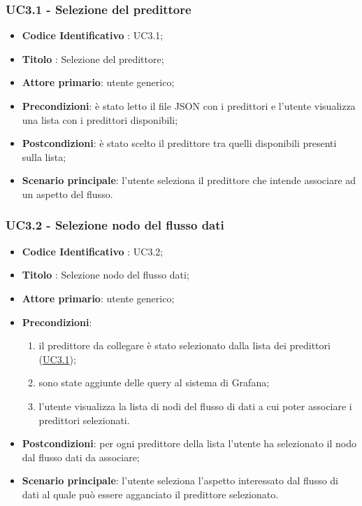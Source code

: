 		\label{par:UC3.1}
		\subsubsection{UC3.1 - Selezione del predittore}
		\begin{itemize}
			\item\textbf{Codice Identificativo} : UC3.1;
			\item\textbf{Titolo} : Selezione del predittore;
			\item\textbf{Attore primario}: utente generico;
			\item\textbf{Precondizioni}: è stato letto il file JSON con i predittori e l'utente visualizza una lista con i predittori disponibili;
			\item\textbf{Postcondizioni}: è stato scelto il predittore tra quelli disponibili presenti sulla lista;
			\item\textbf{Scenario principale}: l'utente seleziona il predittore che intende associare ad un aspetto del flusso.
		\end{itemize}
		
	
	\label{par:UC3.2}
	\subsubsection{UC3.2 - Selezione nodo del flusso dati}
		\begin{itemize}
			\item\textbf{Codice Identificativo} : UC3.2;
			\item\textbf{Titolo} : Selezione nodo del flusso dati;
			\item\textbf{Attore primario}: utente generico;
			\item\textbf{Precondizioni}:
				\begin{enumerate}
					\item il predittore da collegare è stato selezionato dalla lista dei predittori (\hyperref[par:UC3.1]{UC3.1});
					\item sono state aggiunte delle query al sistema di Grafana;
					\item l'utente visualizza la lista di nodi del flusso di dati a cui poter associare i predittori selezionati.
				\end{enumerate}
			\item\textbf{Postcondizioni}: per ogni predittore della lista l'utente ha selezionato il nodo dal flusso dati da associare;
		
			\item\textbf{Scenario principale}: l'utente seleziona l'aspetto interessato dal flusso di dati al quale può essere agganciato il predittore selezionato.
		\end{itemize}

